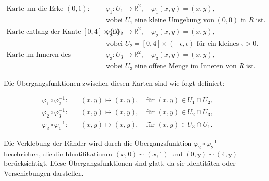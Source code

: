 \documentclass[11pt,a4paper]{article}
\begin{document}
\begin{align*}
\text{Karte um die Ecke } (0,0): \quad & \varphi_1: U_1 \to \mathbb{R}^2, \quad \varphi_1(x,y) = (x,y), \\
& \text{wobei } U_1 \text{ eine kleine Umgebung von } (0,0) \text{ in } R \text{ ist.} \\
\text{Karte entlang der Kante } [0,4] \times \{0\}: \quad & \varphi_2: U_2 \to \mathbb{R}^2, \quad \varphi_2(x,y) = (x,y), \\
& \text{wobei } U_2 = [0,4] \times (-\epsilon, \epsilon) \text{ für ein kleines } \epsilon > 0. \\
\text{Karte im Inneren des Rechtecks:} \quad & \varphi_3: U_3 \to \mathbb{R}^2, \quad \varphi_3(x,y) = (x,y), \\
& \text{wobei } U_3 \text{ eine offene Menge im Inneren von } R \text{ ist.}
\end{align*}

Die Übergangsfunktionen zwischen diesen Karten sind wie folgt definiert:

\begin{align*}
\varphi_1 \circ \varphi_2^{-1}: \quad & (x,y) \mapsto (x,y), \quad \text{für } (x,y) \in U_1 \cap U_2, \\
\varphi_2 \circ \varphi_3^{-1}: \quad & (x,y) \mapsto (x,y), \quad \text{für } (x,y) \in U_2 \cap U_3, \\
\varphi_3 \circ \varphi_1^{-1}: \quad & (x,y) \mapsto (x,y), \quad \text{für } (x,y) \in U_3 \cap U_1.
\end{align*}

Die Verklebung der Ränder wird durch die Übergangsfunktion $\varphi_2 \circ \varphi_2^{-1}$ beschrieben, die die Identifikationen $(x, 0) \sim (x, 1)$ und $(0, y) \sim (4, y)$ berücksichtigt. Diese Übergangsfunktionen sind glatt, da sie Identitäten oder Verschiebungen darstellen.

\end{document}
